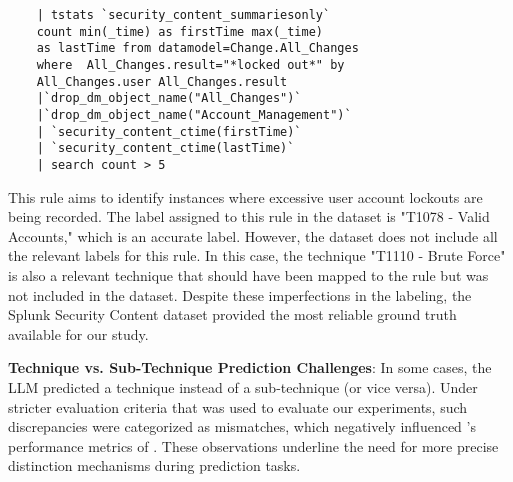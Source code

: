 \begin{verbatim}
    | tstats `security_content_summariesonly` 
    count min(_time) as firstTime max(_time) 
    as lastTime from datamodel=Change.All_Changes 
    where  All_Changes.result="*locked out*" by 
    All_Changes.user All_Changes.result 
    |`drop_dm_object_name("All_Changes")` 
    |`drop_dm_object_name("Account_Management")`
    | `security_content_ctime(firstTime)` 
    | `security_content_ctime(lastTime)` 
    | search count > 5 
\end{verbatim}
\vspace{0.2cm}
This rule aims to identify instances where excessive user account lockouts are being recorded. The label assigned to this rule in the dataset is "T1078 - Valid Accounts," which is an accurate label. 
However, the dataset does not include all the relevant labels for this rule. 
In this case, the technique "T1110 - Brute Force" is also a relevant technique that should have been mapped to the rule but was not included in the dataset.
Despite these imperfections in the labeling, the Splunk Security Content dataset provided the most reliable ground truth available for our study.

\noindent \textbf{Technique vs. Sub-Technique Prediction Challenges}: In some cases, the LLM predicted a technique instead of a sub-technique (or vice versa). 
Under stricter evaluation criteria that was used to evaluate our experiments, such discrepancies were categorized as mismatches, which negatively influenced \methodName's performance metrics of \methodName. 
These observations underline the need for more precise distinction mechanisms during prediction tasks.

